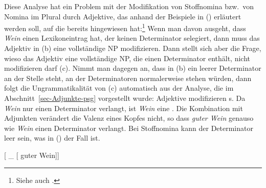 Diese Analyse hat ein Problem mit der Modifikation von Stoffnomina bzw.\ von Nomina im Plural durch
Adjektive, das anhand der Beispiele in () erläutert werden soll, auf die bereits \citet[]{Netter94} hingewiesen hat:\footnote{
  Siehe auch .
}
\eal
{}
\zl 
Wenn man davon ausgeht, dass \emph{Wein} einen Lexikoneintrag hat, der keinen Determinator selegiert,
dann muss das Adjektiv in (b) eine vollständige NP modifizieren. Dann stellt sich aber die
Frage, wieso das Adjektiv eine vollständige NP, die einen Determinator enthält, nicht modifizieren
darf (c). Nimmt man dagegen an, dass in (b) ein leerer Determinator an der Stelle
steht, an der Determinatoren normalerweise stehen würden, dann folgt die Ungrammatikalität von
(c) automatisch aus der Analyse, die im Abschnitt~\ref{sec-Adjunkte-psg} vorgestellt
wurde: Adjektive modifizieren \nbar{}s. Da \emph{Wein} nur einen Determinator verlangt, ist \emph{Wein} eine
\nbar. Die Kombination mit Adjunkten verändert die Valenz eines Kopfes nicht, so dass \emph{guter
  Wein} genauso wie \emph{Wein} einen Determinator verlangt. Bei Stoffnomina kann der Determinator
leer sein, was in () der Fall ist. 


\ea
{}[ \_ [\sub{\nbar} guter Wein]]
\z

